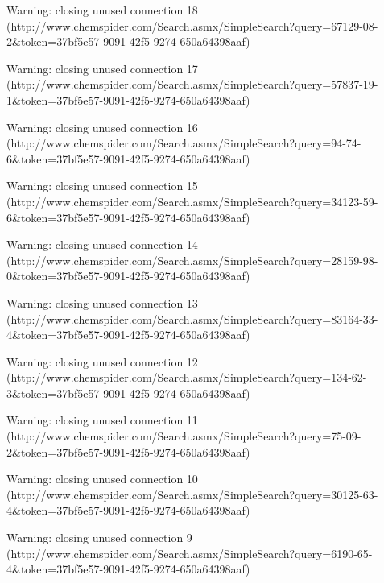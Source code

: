 \documentclass[article, shortnames]{jss}\usepackage[]{graphicx}\usepackage[]{color}
\begin{document}
\begin{CodeChunk}
\begin{CodeOutput}
\end{CodeOutput}
\begin{CodeOutput}
Warning: closing unused connection 18 (http://www.chemspider.com/Search.asmx/SimpleSearch?query=67129-08-2&token=37bf5e57-9091-42f5-9274-650a64398aaf)
\end{CodeOutput}
\begin{CodeOutput}
Warning: closing unused connection 17 (http://www.chemspider.com/Search.asmx/SimpleSearch?query=57837-19-1&token=37bf5e57-9091-42f5-9274-650a64398aaf)
\end{CodeOutput}
\begin{CodeOutput}
Warning: closing unused connection 16 (http://www.chemspider.com/Search.asmx/SimpleSearch?query=94-74-6&token=37bf5e57-9091-42f5-9274-650a64398aaf)
\end{CodeOutput}
\begin{CodeOutput}
Warning: closing unused connection 15 (http://www.chemspider.com/Search.asmx/SimpleSearch?query=34123-59-6&token=37bf5e57-9091-42f5-9274-650a64398aaf)
\end{CodeOutput}
\begin{CodeOutput}
Warning: closing unused connection 14 (http://www.chemspider.com/Search.asmx/SimpleSearch?query=28159-98-0&token=37bf5e57-9091-42f5-9274-650a64398aaf)
\end{CodeOutput}
\begin{CodeOutput}
Warning: closing unused connection 13 (http://www.chemspider.com/Search.asmx/SimpleSearch?query=83164-33-4&token=37bf5e57-9091-42f5-9274-650a64398aaf)
\end{CodeOutput}
\begin{CodeOutput}
Warning: closing unused connection 12 (http://www.chemspider.com/Search.asmx/SimpleSearch?query=134-62-3&token=37bf5e57-9091-42f5-9274-650a64398aaf)
\end{CodeOutput}
\begin{CodeOutput}
Warning: closing unused connection 11 (http://www.chemspider.com/Search.asmx/SimpleSearch?query=75-09-2&token=37bf5e57-9091-42f5-9274-650a64398aaf)
\end{CodeOutput}
\begin{CodeOutput}
Warning: closing unused connection 10 (http://www.chemspider.com/Search.asmx/SimpleSearch?query=30125-63-4&token=37bf5e57-9091-42f5-9274-650a64398aaf)
\end{CodeOutput}
\begin{CodeOutput}
Warning: closing unused connection 9 (http://www.chemspider.com/Search.asmx/SimpleSearch?query=6190-65-4&token=37bf5e57-9091-42f5-9274-650a64398aaf)

\end{CodeOutput}
\end{CodeChunk}
\end{document}
